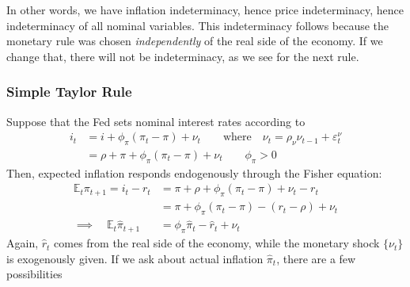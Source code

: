 \documentclass[12pt]{article}
\theoremstyle{plain}
\theoremstyle{definition}
\theoremstyle{remark}
\newcommand{\E}{\mathbb{E}}
\begin{document}
In other words, we have inflation indeterminacy, hence price
indeterminacy, hence indeterminacy of all nominal variables.
This indeterminacy follows because the monetary rule was chosen
\emph{independently} of the real side of the economy. If we change
that, there will not be indeterminacy, as we see for the next rule.

\subsubsection{Simple Taylor Rule}

Suppose that the Fed sets nominal interest rates according to
\begin{align*}
  i_t &= i + \phi_\pi(\pi_t-\pi) + \nu_t
  \qquad\text{where}\quad
  \nu_t = \rho_\nu \nu_{t-1} +\varepsilon^\nu_{t}
  \\
  &= \rho + \pi + \phi_\pi(\pi_t-\pi) + \nu_t
  \qquad \phi_\pi > 0
\end{align*}
Then, expected inflation responds endogenously through the Fisher
equation:
\begin{align*}
  \E_t\pi_{t+1} =
  i_t - r_t
  &=
  \pi + \rho + \phi_\pi(\pi_t-\pi) + \nu_t - r_t
  \\
  &= \pi + \phi_\pi(\pi_t-\pi) - (r_t -\rho) + \nu_t \\
  \implies\quad
  \E_t\hat{\pi}_{t+1}
  &= \phi_\pi\hat{\pi}_t - \hat{r}_t + \nu_t
\end{align*}
Again, $\hat{r}_t$ comes from the real side of the economy, while
the monetary shock $\{\nu_t\}$ is exogenously given. If we ask about
actual inflation $\hat{\pi}_t$, there are a few possibilities
\end{document}
